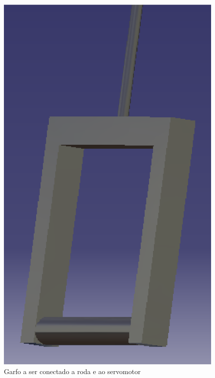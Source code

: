      \begin{figure}[!htbp]
     	\begin{center}
     		\includegraphics[keepaspectratio=true,scale=1]{figuras/direcao2.eps}
     		\caption{Garfo a ser conectado a roda e ao servomotor}
     	\end{center}
     \end{figure}
      
